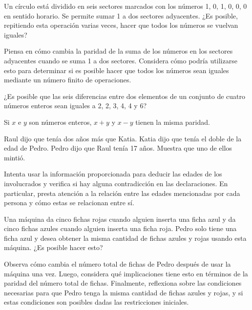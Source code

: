 \documentclass[11pt]{scrartcl}
\begin{document}
\begin{problem}
Un círculo está dividido en seis sectores marcados con los números 1, 0, 1, 0, 0, 0 en sentido horario. Se permite sumar 1 a dos sectores adyacentes. ¿Es posible, repitiendo esta operación varias veces, hacer que todos los números se vuelvan iguales?
    \begin{hint}
    Piensa en cómo cambia la paridad de la suma de los números en los sectores adyacentes cuando se suma 1 a dos sectores. Considera cómo podría utilizarse esto para determinar si es posible hacer que todos los números sean iguales mediante un número finito de operaciones.
    \end{hint}
\end{problem}

\begin{problem}
¿Es posible que las seis diferencias entre dos elementos de un conjunto de cuatro números enteros sean iguales a 2, 2, 3, 4, 4 y 6?
\begin{hint}
Si $x$ e $y$ son números enteros, $x + y$ y $x - y$ tienen la misma paridad.
\end{hint}
\end{problem}

\begin{problem}
Raul dijo que tenía dos años más que Katia. Katia dijo que tenía el doble de la edad de Pedro. Pedro dijo que Raul tenía 17 años. Muestra que uno de ellos mintió.
    \begin{hint}
    Intenta usar la información proporcionada para deducir las edades de los involucrados y verifica si hay alguna contradicción en las declaraciones. En particular, presta atención a la relación entre las edades mencionadas por cada persona y cómo estas se relacionan entre sí.
    \end{hint}
\end{problem}

\begin{problem}
Una máquina da cinco fichas rojas cuando alguien inserta una ficha azul y da cinco fichas azules cuando alguien inserta una ficha roja. Pedro solo tiene una ficha azul y desea obtener la misma cantidad de fichas azules y rojas usando esta máquina. ¿Es posible hacer esto?
    \begin{hint}
    Observa cómo cambia el número total de fichas de Pedro después de usar la máquina una vez. Luego, considera qué implicaciones tiene esto en términos de la paridad del número total de fichas. Finalmente, reflexiona sobre las condiciones necesarias para que Pedro tenga la misma cantidad de fichas azules y rojas, y si estas condiciones son posibles dadas las restricciones iniciales.
    \end{hint}
\end{problem}
\end{document}
